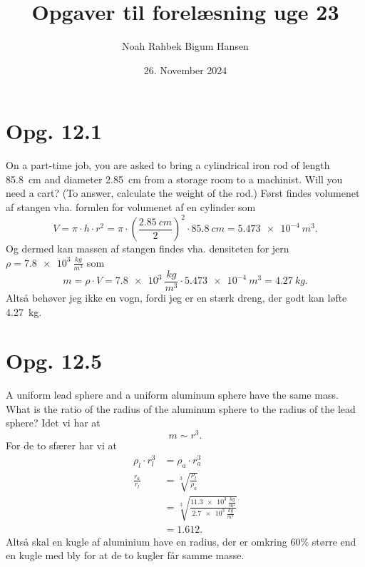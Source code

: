 \documentclass[12pt]{article}
\title{Opgaver til forelæsning uge 23}
\author{Noah Rahbek Bigum Hansen}
\date{26. November 2024}
\theoremstyle{definition}
\begin{document}
\maketitle

\section*{Opg. 12.1}
On a part-time job, you are asked to bring a cylindrical iron rod of length \qty{85,8}{cm} and diameter \qty{2,85}{cm} from a storage room to a machinist. Will you need a cart? (To answer, calculate the weight of the rod.)
\bigbreak
Først findes volumenet af stangen vha. formlen for volumenet af en cylinder som
\[ 
V = \pi \cdot h\cdot r^2 = \pi \cdot \left( \frac{\qty{2,85}{cm}}{2} \right)^2 \cdot \qty{85,8}{cm} = \qty{5,473e-4}{m^3} 
.\]
Og dermed kan massen af stangen findes vha. densiteten for jern $\rho = \qty{7,8e3}{\frac{kg}{m^3}}$ som
\[ 
m = \rho \cdot V = \qty{7,8e3}{\frac{kg}{m^3}} \cdot \qty{5,473e-4}{m^3} = \qty{4,27}{kg} 
.\]
Altså behøver jeg ikke en vogn, fordi jeg er en stærk dreng, der godt kan løfte \qty{4,27}{kg}.



\section*{Opg. 12.5}
A uniform lead sphere and a uniform aluminum sphere have the same mass. What is the ratio of the radius of the aluminum sphere to the radius of the lead sphere?
\bigbreak
Idet vi har at
\[ 
m \sim r^3
.\]
For de to sfærer har vi at
\begin{align*}
  \rho_l \cdot r_l^3 &= \rho_a \cdot r_a^3 \\
  \frac{r_a}{r_l} &= \sqrt[3]{\frac{\rho_l}{\rho_a}} \\
                  &= \sqrt[3]{\frac{\qty{11,3e3}{\frac{kg}{m^3}}}{\qty{2,7e3}{\frac{kg}{m^3}} }} \\
                  &= \num{1,612}  
.\end{align*}
Altså skal en kugle af aluminium have en radius, der er omkring 60\% større end en kugle med bly for at de to kugler får samme masse.
\end{document}
